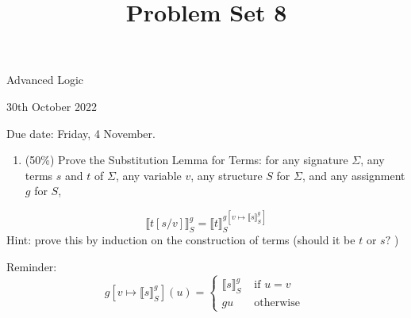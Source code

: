 \documentclass[10pt]{article}
\title{Problem Set 8 }
\author{}
\date{}
\begin{document}
\maketitle
Advanced Logic

30th October 2022

Due date: Friday, 4 November.

\begin{enumerate}
  \item (50\%) Prove the Substitution Lemma for Terms: for any signature $\Sigma$, any terms $s$ and $t$ of $\Sigma$, any variable $v$, any structure $S$ for $\Sigma$, and any assignment $g$ for $S$,
\end{enumerate}

$$
\llbracket t[s / v] \rrbracket_{S}^{g}=\llbracket t \rrbracket_{S}^{g\left[v \mapsto \llbracket s \rrbracket_{S}^{g}\right]}
$$
Hint: prove this by induction on the construction of terms (should it be $t$ or $s ?$ )

Reminder:
$$
g\left[v \mapsto \llbracket s \rrbracket_{S}^{g}\right](u)= \begin{cases}\llbracket s \rrbracket_{S}^{g} & \text { if } u=v \\ g u & \text { otherwise }\end{cases}
$$
\end{document}

